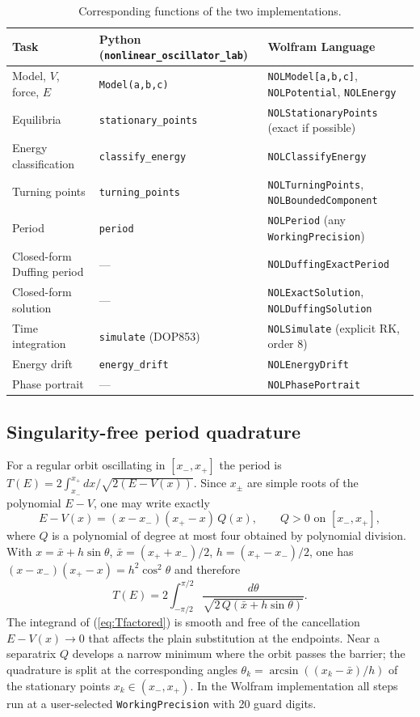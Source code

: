 \documentclass[11pt]{article}
\begin{document}
\begin{table}[H]\centering\footnotesize
\caption{Corresponding functions of the two implementations.}\label{tab:api}
\begin{tabular}{@{}lll@{}}\toprule
Task & Python (\texttt{nonlinear\_oscillator\_lab}) & Wolfram Language \\\midrule
Model, $V$, force, $E$ & \texttt{Model(a,b,c)} & \texttt{NOLModel[a,b,c]}, \texttt{NOLPotential}, \texttt{NOLEnergy}\\
Equilibria & \texttt{stationary\_points} & \texttt{NOLStationaryPoints} (exact if possible)\\
Energy classification & \texttt{classify\_energy} & \texttt{NOLClassifyEnergy}\\
Turning points & \texttt{turning\_points} & \texttt{NOLTurningPoints}, \texttt{NOLBoundedComponent}\\
Period & \texttt{period} & \texttt{NOLPeriod} (any \texttt{WorkingPrecision})\\
Closed-form Duffing period & --- & \texttt{NOLDuffingExactPeriod}\\
Closed-form solution & --- & \texttt{NOLExactSolution}, \texttt{NOLDuffingSolution}\\
Time integration & \texttt{simulate} (DOP853) & \texttt{NOLSimulate} (explicit RK, order 8)\\
Energy drift & \texttt{energy\_drift} & \texttt{NOLEnergyDrift}\\
Phase portrait & --- & \texttt{NOLPhasePortrait}\\\bottomrule
\end{tabular}\end{table}

\subsection{Singularity-free period quadrature}\label{sec:period}
For a regular orbit oscillating in $[x_-,x_+]$ the period is $T(E)=2\int_{x_-}^{x_+}dx/\sqrt{2(E-V(x))}$. Since $x_\pm$ are simple roots of the polynomial $E-V$, one may write exactly
\begin{equation}E-V(x)=(x-x_-)(x_+-x)\,Q(x),\qquad Q>0 \text{ on } [x_-,x_+],\end{equation}
where $Q$ is a polynomial of degree at most four obtained by polynomial division. With $x=\bar x+h\sin\theta$, $\bar x=(x_++x_-)/2$, $h=(x_+-x_-)/2$, one has $(x-x_-)(x_+-x)=h^2\cos^2\theta$ and therefore
\begin{equation}T(E)=2\int_{-\pi/2}^{\pi/2}\frac{d\theta}{\sqrt{2\,Q(\bar x+h\sin\theta)}}.\label{eq:Tfactored}\end{equation}
The integrand of (\ref{eq:Tfactored}) is smooth and free of the cancellation $E-V(x)\to0$ that affects the plain substitution at the endpoints. Near a separatrix $Q$ develops a narrow minimum where the orbit passes the barrier; the quadrature is split at the corresponding angles $\theta_k=\arcsin((x_k-\bar x)/h)$ of the stationary points $x_k\in(x_-,x_+)$. In the Wolfram implementation all steps run at a user-selected \texttt{WorkingPrecision} with 20 guard digits.
\end{document}

